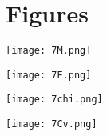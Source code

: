 \documentclass{article}
\begin{document}
\section*{Figures}

\begin{center}
    \texttt{[image: 7M.png]}
\end{center}

\begin{center}
    \texttt{[image: 7E.png]}
\end{center}

\begin{center}
    \texttt{[image: 7chi.png]}
\end{center}

\begin{center}
    \texttt{[image: 7Cv.png]}
\end{center}
\end{document}
